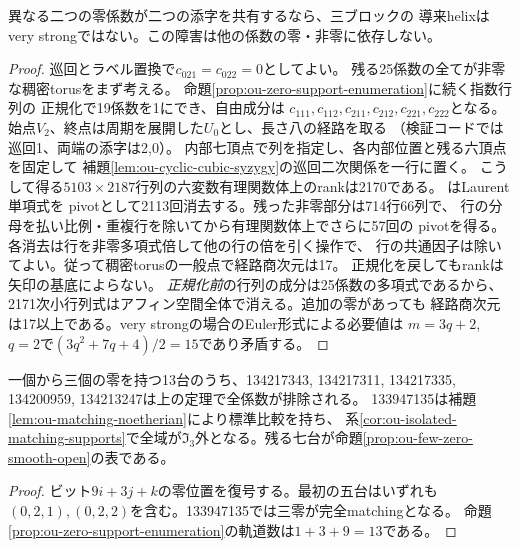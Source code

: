 \begin{theorem}[二添字が一致する二零の全特殊化排除]
\label{thm:ou-two-collinear-zeros}
異なる二つの零係数が二つの添字を共有するなら、三ブロックの
導来helixはvery strongではない。この障害は他の係数の零・非零に依存しない。
\end{theorem}
\begin{proof}
巡回とラベル置換で$c_{021}=c_{022}=0$としてよい。
残る25係数の全てが非零な稠密torusをまず考える。
命題\ref{prop:ou-zero-support-enumeration}に続く指数行列の
正規化で19係数を1にでき、自由成分は
$c_{111},c_{112},c_{211},c_{212},c_{221},c_{222}$となる。
始点$V_2$、終点は周期を展開した$U_0$とし、長さ八の経路を取る
（検証コードでは巡回1、両端の添字は2,0）。
内部七頂点で列を指定し、各内部位置と残る六頂点を固定して
補題\ref{lem:ou-cyclic-cubic-syzygy}の巡回二次関係を一行に置く。
こうして得る$5103\times2187$行列の六変数有理関数体上のrankは2170である。
はLaurent単項式を
pivotとして2113回消去する。残った非零部分は714行66列で、
行の分母を払い比例・重複行を除いてから有理関数体上でさらに57回の
pivotを得る。各消去は行を非零多項式倍して他の行の倍を引く操作で、
行の共通因子は除いてよい。従って稠密torusの一般点で経路商次元は17。
正規化を戻してもrankは矢印の基底によらない。
\emph{正規化前}の行列の成分は25係数の多項式であるから、
2171次小行列式はアフィン空間全体で消える。追加の零があっても
経路商次元は17以上である。very strongの場合のEuler形式による必要値は
$m=3q+2$, $q=2$で$(3q^2+7q+4)/2=15$であり矛盾する。
\end{proof}

\begin{corollary}
一個から三個の零を持つ13台のうち、134217343, 134217311, 134217335,
134200959, 134213247は上の定理で全係数が排除される。
133947135は補題\ref{lem:ou-matching-noetherian}により標準比較を持ち、
系\ref{cor:ou-isolated-matching-supports}で全域が$\mathfrak I_3$外となる。残る七台が命題\ref{prop:ou-few-zero-smooth-open}の表である。
\end{corollary}
\begin{proof}
ビット$9i+3j+k$の零位置を復号する。最初の五台はいずれも
$(0,2,1),(0,2,2)$を含む。133947135では三零が完全matchingとなる。
命題\ref{prop:ou-zero-support-enumeration}の軌道数は$1+3+9=13$である。
\end{proof}

